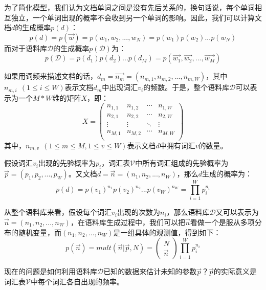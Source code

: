 为了简化模型，我们认为文档单词之间是没有先后关系的，换句话说，每个单词相互独立，一个单词出现的概率不会收到另一个单词的影响。因此，我们可以计算文档$d$的生成概率$p(d)$：
\begin{equation}
  p(d)=p(\vec{w})=p(w_1,w_2,...,w_N)=p(w_1)p(w_2)...p(w_N)
\end{equation}
而对于语料库$\mathcal{D}$的生成概率$p(\mathcal{D})$为：
\begin{equation}
  p(\mathcal{D})=p(d_1)p(d_2)...p(d_M)=p(\vec{w_1},\vec{w_2},...,\vec{w_M})
\end{equation}

如果用词频来描述文档的话，$d_m=\vec{n_m}=(n_{m,1},n_{m,2},...,n_{m,W})$，其中$n_{m,i}~~(1\le i\le W)$表示文档$d_m$中出现词汇$v_i$的频数。于是，整个语料库$\mathcal{D}$可以表示为一个$M*W$维的矩阵$X$，即：
\begin{equation*}
  X=\left(
  \begin{array}{cccc}
    n_{1,1} & n_{1,2} & \cdots & n_{1,W} \\
    n_{2,1} & n_{2,2} & \cdots & n_{2,W} \\
    \vdots & \vdots & \ddots & \vdots \\ 
    n_{M,1} & n_{M,2} & \cdots & n_{M,W} \\
  \end{array}
  \right)
\end{equation*}
其中，$n_{m,v}~~(1\le m\le M,1\le v\le W)$表示文档$d$中拥有词汇$v$的数量。

假设词汇$v_i$出现的先验概率为$p_i$，词汇表$\mathcal{V}$中所有词汇组成的先验概率为$\vec{p}=(p_1,p_2,...,p_W)$。又文档$d=\vec{n}=(n_1,n_2,...,n_W)$，那么$d$生成的概率为：
\begin{equation}
  p(d)=p(v_1)^{n_1}p(v_2)^{n_2}...p(v_W)^{n_W}=\prod_{i=1}^{W}p_i^{n_i}
\end{equation}

从整个语料库来看，假设每个词汇$v_i$出现的次数为$n_i$，那么语料库$\mathcal{D}$又可以表示为$\vec{n}=(n_1,n_2,...,n_W)$，在语料库生成过程中，我们可以把$\vec{n}$看做一个是服从多项分布的随机变量，而$(n_1,n_2,...,n_W)$是一组具体的观测值，得到如下：
\begin{equation}
  \label{eq:vocmulti}
  p(\vec{n})=mult(\vec{n}|\vec{p},N)=
  \begin{pmatrix}
    N \\
    \vec{n}
  \end{pmatrix}
  \prod_{i=1}^Wp_i^{n_i}
\end{equation}

现在的问题是如何利用语料库$\mathcal{D}$已知的数据来估计未知的参数$\vec{p}$？$\vec{p}$的实际意义是词汇表$\mathcal{V}$中每个词汇各自出现的频率。

